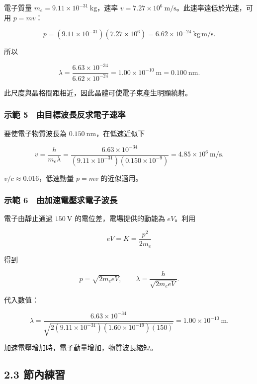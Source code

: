 \documentclass[11pt,a4paper]{article}
\begin{document}
電子質量 \(m_e=9.11\times10^{-31}\ \mathrm{kg}\)，速率 \(v=7.27\times10^6\ \mathrm{m/s}\)。此速率遠低於光速，可用 \(p=mv\)：

\[
p=(9.11\times10^{-31})(7.27\times10^6)
=6.62\times10^{-24}\ \mathrm{kg\,m/s}.
\]

所以

\[
\lambda=\frac{6.63\times10^{-34}}{6.62\times10^{-24}}
=1.00\times10^{-10}\ \mathrm m
=0.100\ \mathrm{nm}.
\]

此尺度與晶格間距相近，因此晶體可使電子束產生明顯繞射。

\subsubsection{示範 5　由目標波長反求電子速率}\label{ux793aux7bc4-5-ux7531ux76eeux6a19ux6ce2ux9577ux53cdux6c42ux96fbux5b50ux901fux7387}

要使電子物質波長為 \(0.150\ \mathrm{nm}\)，在低速近似下

\[
v=\frac{h}{m_e\lambda}
=\frac{6.63\times10^{-34}}
{(9.11\times10^{-31})(0.150\times10^{-9})}
=4.85\times10^6\ \mathrm{m/s}.
\]

\(v/c\approx0.016\)，低速動量 \(p=mv\) 的近似適用。

\subsubsection{示範 6　由加速電壓求電子波長}\label{ux793aux7bc4-6-ux7531ux52a0ux901fux96fbux58d3ux6c42ux96fbux5b50ux6ce2ux9577}

電子由靜止通過 \(150\ \mathrm V\) 的電位差，電場提供的動能為 \(eV\)。利用

\[
eV=K=\frac{p^2}{2m_e}
\]

得到

\[
p=\sqrt{2m_e eV},
\qquad
\lambda=\frac{h}{\sqrt{2m_e eV}}.
\]

代入數值：

\[
\lambda=
\frac{6.63\times10^{-34}}
{\sqrt{2(9.11\times10^{-31})(1.60\times10^{-19})(150)}}
=1.00\times10^{-10}\ \mathrm m.
\]

加速電壓增加時，電子動量增加，物質波長縮短。

\subsection{2.3 節內練習}\label{ux7bc0ux5167ux7df4ux7fd2-1}
\end{document}
